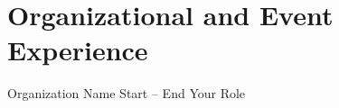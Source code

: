 \section{Organizational and Event Experience}
\entry
{Organization Name}
{Start -- End}
{Your Role}

